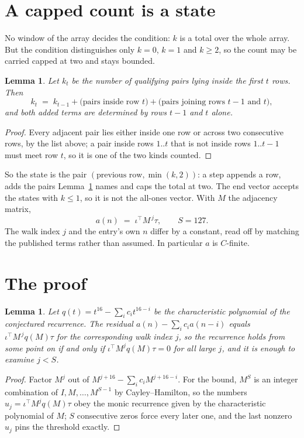 \documentclass[11pt,a4paper]{article}
\theoremstyle{plain}
\newtheorem{lemma}[theorem]{Lemma}
\theoremstyle{definition}
\begin{document}
\section{A capped count is a state}

No window of the array decides the condition: $k$ is a total over the whole array. But the
condition distinguishes only $k=0$, $k=1$ and $k\ge2$, so the count may be carried capped at
two and stays bounded.

\begin{lemma}\label{lem:cap}
Let $k_t$ be the number of qualifying pairs lying inside the first $t$ rows. Then
\[
k_{t}\;=\;k_{t-1}+\bigl(\text{pairs inside row } t\bigr)
+\bigl(\text{pairs joining rows } t-1 \text{ and } t\bigr),
\]
and both added terms are determined by rows $t-1$ and $t$ alone.
\end{lemma}

\begin{proof}
Every adjacent pair lies either inside one row or across two consecutive rows, by the list
above; a pair inside rows $1..t$ that is not inside rows $1..t-1$ must meet row $t$, so it is
one of the two kinds counted.
\end{proof}

So the state is the pair $(\text{previous row},\min(k,2))$: a step appends a row, adds the
pairs Lemma~\ref{lem:cap} names and caps the total at two. The end vector accepts the states
with $k\le1$, so it is not the all-ones vector. With $M$ the adjacency matrix,
\[
a(n)\;=\;\iota^{\!\top}M^{\,j}\tau ,\qquad S=127.
\]
The walk index $j$ and the entry's own $n$ differ by a constant, read off by matching the
published terms rather than assumed. In particular $a$ is $C$-finite.

\section{The proof}

\begin{lemma}\label{lem:crit}
Let $q(t)=t^{16}-\sum_i c_it^{16-i}$ be the characteristic polynomial of the
conjectured recurrence. The residual $a(n)-\sum_ic_ia(n-i)$ equals
$\iota^{\!\top}M^{\,j}q(M)\tau$ for the corresponding walk index $j$, so the recurrence
holds from some point on if and only if $\iota^{\!\top}M^{j}q(M)\tau=0$ for all large $j$,
and it is enough to examine $j<S$.
\end{lemma}

\begin{proof}
Factor $M^{j}$ out of $M^{j+16}-\sum_ic_iM^{j+16-i}$. For the bound, $M^{S}$
is an integer combination of $I,M,\dots,M^{S-1}$ by Cayley--Hamilton, so the numbers
$u_j=\iota^{\!\top}M^{j}q(M)\tau$ obey the monic recurrence given by the characteristic
polynomial of $M$; $S$ consecutive zeros force every later one, and the last nonzero $u_j$
pins the threshold exactly.
\end{proof}
\end{document}
